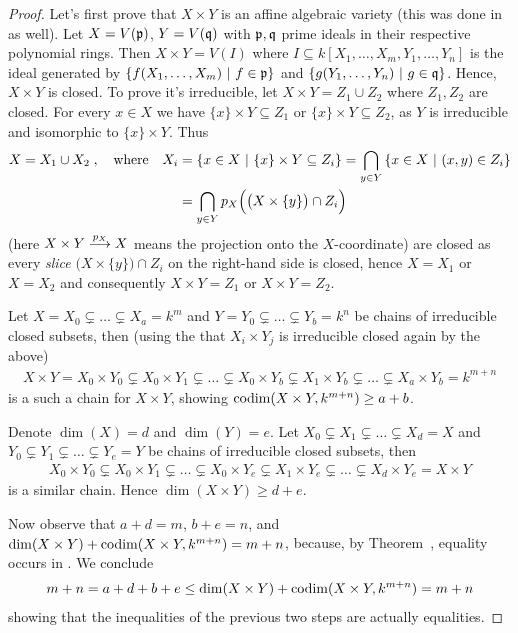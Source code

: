 \documentclass[a4paper,parskip=half,numbers=enddot, DIV=12, headheight=30pt]{scrreprt}
\begin{document}
\begin{proof}
	Let's first prove that $X\times Y$ is an affine algebraic variety (this was done in \cite[proof of Proposition~2.2.6]{alg1} as well). Let $X=V(\mathfrak{p})$, $Y=V(\mathfrak{q})$ with $\mathfrak{p},\mathfrak{q}$ prime ideals in their respective polynomial rings. Then $X\times Y=V(I)$ where $I\subseteq k[X_1,\ldots,X_m,Y_1,\ldots,Y_n]$ is  the ideal generated by $\left\{f(X_1,\ldots,X_m)\ \middle|\  f\in\mathfrak{p}\right\}$ and $\left\{g(Y_1,\ldots,Y_n)\ \middle|\  g\in\mathfrak{q}\right\}$. Hence, $X\times Y$ is closed.
    To prove it's irreducible, let $X\times Y = Z_1\cup Z_2$ where $Z_1,Z_2$ are closed. For every $x\in X$ we have $\{x\}\times Y\subseteq Z_1$ or $\{x\}\times Y\subseteq Z_2$, as $Y$ is irreducible and isomorphic to $\{x\}\times Y$. Thus 
    \begin{align*}
    	X= X_1\cup X_2\;,\quad\text{where}\quad X_i&=\left\{x\in X\ \middle|\  \{x\}\times Y\subseteq Z_i\right\} = \bigcap_{y\in Y}\left\{x\in X\ \middle|\  (x,y)\in Z_i\right\}\\
    	&=\bigcap_{y\in Y} p_X\Big(\big(X\times\{y\}\big)\cap Z_i\Big)
    \end{align*}
    (here $X\times Y\morphism[p_X] X$ means the projection onto the $X$-coordinate) are closed as every \emph{slice} $\big(X\times\{y\}\big)\cap Z_i$ on the right-hand side is closed, hence $X=X_1$ or $X=X_2$ and consequently $X\times Y = Z_1$ or $X\times Y=Z_2$.
    
	Let $X= X_0\subsetneq \ldots\subsetneq X_a=k^m$ and $Y= Y_0\subsetneq \ldots\subsetneq Y_b=k^n$ be chains of irreducible closed subsets, then (using the that $X_i\times Y_j$ is irreducible closed again by the above)
    \begin{align*}
        X\times Y = X_0\times Y_0 \subsetneq X_0\times Y_1\subsetneq\ldots\subsetneq X_0\times Y_b\subsetneq X_1\times Y_b\subsetneq \ldots\subsetneq X_a\times Y_b = k^{m+n}
    \end{align*}
    is a such a chain for $X\times Y$, showing $\operatorname{codim}(X\times Y,k^{m+n})\geq a+b$.
    
	Denote $\dim (X)=d$ and $\dim (Y)=e$. Let $X_0\subsetneq X_1\subsetneq \ldots\subsetneq X_d=X$ and $Y_0\subsetneq Y_1\subsetneq \ldots\subsetneq Y_e=Y$ be chains of irreducible closed subsets, then 
    \begin{align*}
        X_0\times Y_0 \subsetneq X_0\times Y_1\subsetneq\ldots\subsetneq X_0\times Y_e\subsetneq X_1\times Y_e\subsetneq \ldots\subsetneq X_d\times Y_e =X \times Y
    \end{align*}
    is a similar chain. Hence $\dim(X\times Y)\geq d+e$.
    
    Now observe that $a+d=m$, $b+e=n$, and $\dim(X\times Y)+\operatorname{codim}(X\times Y,k^{m+n}) = m+n$, because, by Theorem~, equality occurs in . We conclude
    \begin{align*}
        m+n = a+d+b+e \leq \dim(X\times Y) +\operatorname{codim}(X\times Y,k^{m+n}) = m+n
    \end{align*}
    showing that the inequalities of the previous two steps are actually equalities.
\end{proof}
\end{document}
